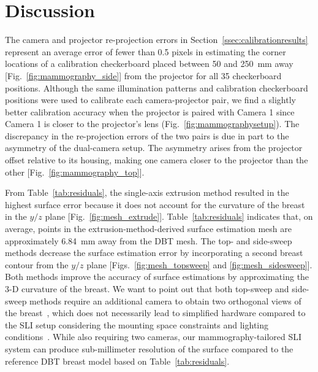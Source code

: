 


\section{Discussion}
\label{chap:omci:discussion}

The camera and projector re-projection errors in Section~\ref{ssec:calibrationresults} represent an average error of fewer than 0.5 pixels in estimating the corner locations of a calibration checkerboard placed between 50 and 250~mm away [Fig.~\ref{fig:mammography_side}] from the projector for all 35 checkerboard positions. Although the same illumination patterns and calibration checkerboard positions were used to calibrate each camera-projector pair, we find a slightly better calibration accuracy when the projector is paired with Camera 1 since Camera 1 is closer to the projector's lens (Fig.~\ref{fig:mammographysetup}). The discrepancy in the re-projection errors of the two pairs is due in part to the asymmetry of the dual-camera setup. The asymmetry arises from the projector offset relative to its housing, making one camera closer to the projector than the other [Fig.~\ref{fig:mammography_top}]. 

From Table~\ref{tab:residuals}, the single-axis extrusion method resulted in the highest surface error because it does not account for the curvature of the breast in the $y/z$ plane [Fig.~\ref{fig:mesh_extrude}]. Table~\ref{tab:residuals} indicates that, on average, points in the extrusion-method-derived surface estimation mesh are approximately 6.84~mm away from the \ac{DBT} mesh. The top- and side-sweep methods decrease the surface estimation error by incorporating a second breast contour from the $y/z$ plane [Figs.~\ref{fig:mesh_topsweep} and \ref{fig:mesh_sidesweep}]. Both methods improve the accuracy of surface estimations by approximating the 3-D curvature of the breast. We want to point out that both top-sweep and side-sweep methods require an additional camera to obtain two orthogonal views of the breast~\cite{Pinto2020}, which does not necessarily lead to simplified hardware compared to the \ac{SLI} setup considering the mounting space constraints and lighting conditions~\cite{Rodriguez2017}. While also requiring two cameras, our mammography-tailored \ac{SLI} system can produce sub-millimeter resolution of the surface compared to the reference \ac{DBT} breast model based on Table~\ref{tab:residuals}.

